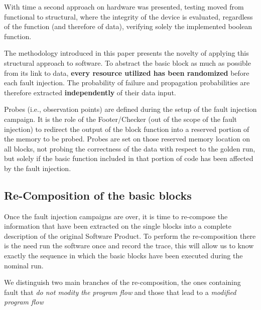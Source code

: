 \documentclass[./dissertation.tex]{subfiles}
\begin{document}
With time a second approach on hardware was presented, testing moved from functional to structural, where the integrity of the device is evaluated, regardless of the function (and therefore of data), verifying solely the implemented boolean function.

The methodology introduced in this paper presents the novelty of applying this structural approach to software. To abstract the basic block as much as possible from its link to data, \textbf{every resource utilized has been randomized} before each fault injection. The probability of failure and propagation probabilities are therefore extracted \textbf{independently} of their data input.

Probes (i.e., observation points) are defined during the setup of the fault injection campaign. It is the role of the Footer/Checker (out of the scope of the fault injection) to redirect the output of the block function into a reserved portion of the memory to be probed. Probes are set on those reserved memory location on all blocks, not probing the correctness of the data with respect to the golden run, but solely if the basic function included in that portion of code has been affected by the fault injection. 

\subsection{Re-Composition of the basic blocks}
Once the fault injection campaigns are over, it is time to re-compose the information that have been extracted on the single blocks into a complete description of the original Software Product. To perform the re-composition there is the need run the software once and record the trace, this will allow us to know exactly the sequence in which the basic blocks have been executed during the nominal run.  

We distinguish two main branches of the re-composition, the ones containing fault that \textit{do not modity the program flow} and those that lead to a \textit{modified program flow} 
\end{document}
